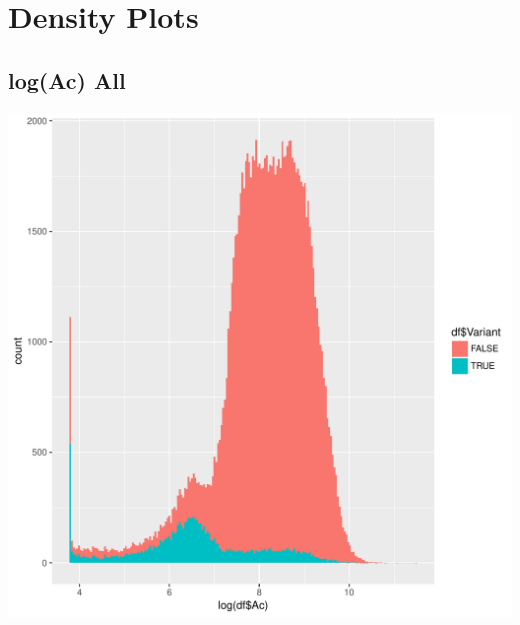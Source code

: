 \documentclass{article}\usepackage[]{graphicx}\usepackage[]{color}
\newenvironment{knitrout}{}{} %
\begin{document}
\section{Density Plots}
\subsection{log(Ac) All}
\begin{knitrout}
\color{fgcolor}
\includegraphics[width=1\linewidth]{figure/dens_all-1} 

\end{knitrout}
\clearpage
\end{document}
